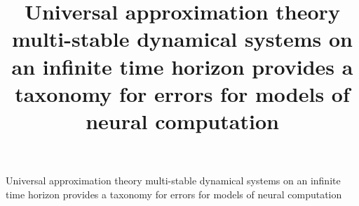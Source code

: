 \documentclass[10pt]{article}
\begin{document}

\title{Universal approximation theory multi-stable dynamical systems on an infinite time horizon provides a taxonomy for errors for models of neural computation}

\begin{center}
\Large{Universal approximation theory multi-stable dynamical systems on an infinite time horizon provides a taxonomy for errors for models of neural computation}
\end{center}
\end{document}
